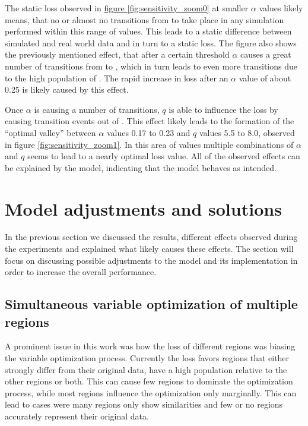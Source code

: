 The static loss observed in \hyperref[fig:sensitivity_zoom0]{figure \ref*{fig:sensitivity_zoom0}} at smaller $\alpha$ values likely means,
that no or almost no transitions from  to  take place in any simulation performed within this range of values. This
leads to a static difference between simulated and real world data and in turn to a static loss. The figure also shows the
previously mentioned effect, that after a certain threshold $\alpha$ causes a great number of transitions from  to , which
in turn leads to even more transitions due to the high population of . The rapid increase in loss after an $\alpha$ value of
about 0.25 is likely caused by this effect. \newline 

Once $\alpha$ is causing a number of transitions, $q$ is able to influence the loss by causing transition events out of .
This effect likely leads to the formation of the ``optimal valley'' between $\alpha$ values 0.17 to 0.23 and $q$ values
5.5 to 8.0, observed in figure \ref*{fig:sensitivity_zoom1}. In this area of values multiple combinations of $\alpha$ and
$q$ seems to lead to a nearly optimal loss value. All of the observed effects can be explained by the model, indicating that
the model behaves as intended.


\section{Model adjustments and solutions}
In the previous section we discussed the results, different effects observed during the experiments and explained what
likely causes these effects. The section will focus on discussing possible adjustments to the model and its implementation
in order to increase the overall performance.


\subsection{Simultaneous variable optimization of multiple regions}
A prominent issue in this work was how the loss of different regions was biasing the variable optimization process. Currently the loss
favors regions that either strongly differ from their original data, have a high population relative to the other regions or
both. This can cause few regions to dominate the optimization process, while most regions influence the optimization only marginally.
This can lead to cases were many regions only show similarities and few or no regions accurately represent their original data. \newline

